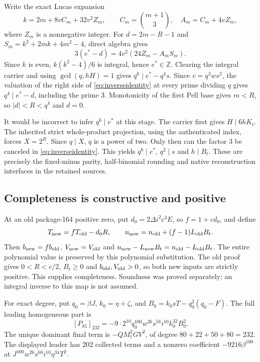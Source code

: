 \documentclass[10pt,letterpaper]{article}
\newcommand{\Z}{\mathbb Z}
\theoremstyle{remark}\newtheorem{remark}[theorem]{Remark}
\begin{document}
Write the exact Lucas expansion
\[
 k=2m+8vC_m+32v^2Z_m,\qquad C_m=\binom{m+1}{3},
 \quad A_m=C_m+4vZ_m,
\]
where $Z_m$ is a nonnegative integer. For $d=2m-R-1$ and
$S_m=k^2+2mk+4m^2-4$, direct algebra gives
\begin{equation}\label{eq:inverseidentity}
 3(e^*-d)=4v^2(24Z_m-A_mS_m).
\end{equation}
Since $k$ is even, $k(k^2-4)/6$ is integral, hence $e^*\in\Z$.
Clearing the integral carrier and using $\gcd(q,hH)=1$ gives
$q^6\mid e^*-q^4s$. Since $v=q^3ws^2$,
the valuation of the right side of \eqref{eq:inverseidentity} at every
prime dividing $q$ gives $q^4\mid e^*-d$, including the prime 3.
Monotonicity of the first Pell base gives $m<R$, so
$|d|<R<q^4$ and $d=0$.

It would be incorrect to infer $q^6\mid e^*$ at this stage. The carrier
first gives $H\mid6hK_t$. The inherited strict whole-product projection,
using the authenticated index, forces $X=2^R$. Since $q\mid X$, $q$ is
a power of two. Only then can the factor 3 be canceled in
\eqref{eq:inverseidentity}. This yields $q^6\mid e^*$, $q^2\mid s$ and
$h\mid B_t$. These are precisely the fixed-minus parity, half-binomial
rounding and native reconstruction interfaces in the retained sources.

\subsection{Completeness is constructive and positive}

At an old package-164 positive zero, put
$d_0=2\Delta i^2c^3E$, so $f=1+cd_0$, and define
\[
 T_{\rm new}=fT_{\rm old}-d_0R,\qquad
 n_{\rm new}=n_{\rm old}+(f-1)L_{\rm old}B_t.
\]
Then $b_{\rm new}=fb_{\rm old}$, $V_{\rm new}=V_{\rm old}$ and
$n_{\rm new}-L_{\rm new}B_t=n_{\rm old}-L_{\rm old}B_t$.
The entire polynomial value is preserved by this polynomial substitution.
The old proof gives $0<R<c/2$, $B_t\ge0$ and $b_{\rm old},V_{\rm old}>0$,
so both new inputs are strictly positive. This supplies completeness.
Soundness was proved separately; an integral inverse to this map is not
assumed.

For exact degree, put $q_0=\beta J$, $k_0=\eta+\zeta$, and
$B_0=k_0sT-q_0^2(q_0-F)$. The full leading homogeneous part is
\[
 [P_{85}]_{232}=-9\cdot2^{10}q_0^{100}w^{26}s^{58}i^{10}k_0^{32}B_0^2.
\]
The unique dominant final term is $-QM_t^2GV^2$, of degree
$80+22+50+80=232$. The displayed leader has 202 collected terms and a
nonzero coefficient $-9216\beta^{100}$ at
$J^{100}w^{26}s^{60}i^{10}\eta^{34}T^2$.
\end{document}
